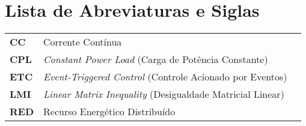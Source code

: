 
\chapter*{Lista de Abreviaturas e Siglas}

\begin{longtable}{lL{14cm}L{\textwidth}}

\textbf{CC} & Corrente Contínua \\
\textbf{CPL} & \textit{Constant Power Load} (Carga de Potência Constante) \\
\textbf{ETC} & \textit{Event-Triggered Control} (Controle Acionado por Eventos) \\
\textbf{LMI} & \textit{Linear Matrix Inequality} (Desigualdade Matricial Linear) \\
\textbf{RED} & Recurso Energético Distribuído \\

\end{longtable}

